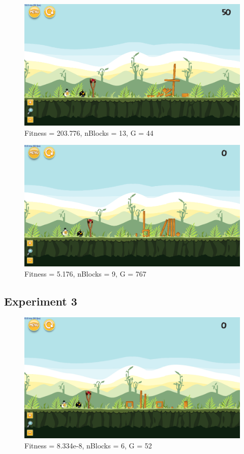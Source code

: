 \begin{figure}[H]
	\centering
	\includegraphics[scale=0.35]{gfx/e2/level-0-base_large180529_221751.png}
	\caption{Fitness = 203.776, nBlocks = 13, G = 44 }\label{f:e2-3}
\end{figure}

\begin{figure}[H]
	\centering
	\includegraphics[scale=0.35]{gfx/e2/level-0-base_large180529_223045.png}
	\caption{Fitness = 5.176, nBlocks = 9, G = 767  }\label{f:e2-4}
\end{figure}

\subsection{Experiment 3}\label{a:e3}
\begin{figure}[H]
	\centering
	\includegraphics[scale=0.35]{gfx/e3/level-0-second_crossover180613_010758.png}
	\caption{Fitness = 8.334e-8, nBlocks = 6, G = 52 }\label{f:e3-1}
\end{figure}

